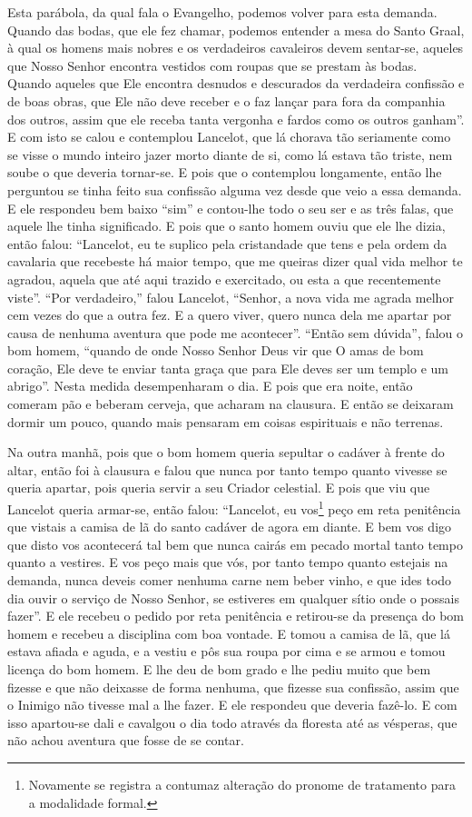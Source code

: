 Esta parábola, da qual fala o Evangelho, podemos volver para esta demanda.
Quando das bodas, que ele fez chamar, podemos entender a mesa do Santo Graal, à
qual os homens mais nobres e os verdadeiros cavaleiros devem sentar-se, aqueles
que Nosso Senhor encontra vestidos com roupas que se prestam às bodas. Quando
aqueles que Ele encontra desnudos e descurados da verdadeira confissão e de
boas obras, que Ele não deve receber e o faz lançar para fora da companhia dos
outros, assim que ele receba tanta vergonha e fardos como os outros ganham”.  E
com isto se calou e contemplou Lancelot, que lá chorava tão seriamente como se
visse o mundo inteiro jazer morto diante de si, como lá estava tão triste, nem
soube o que deveria tornar-se. E pois que o contemplou longamente, então lhe
perguntou se tinha feito sua confissão alguma vez desde que veio a essa
demanda. E ele respondeu bem baixo “sim” e contou-lhe todo o seu ser e as três
falas, que aquele lhe tinha significado. E pois que o santo homem ouviu que ele
lhe dizia, então falou: “Lancelot, eu te suplico pela cristandade que tens e
pela ordem da cavalaria que recebeste há maior tempo, que me queiras dizer qual
vida melhor te agradou, aquela que até aqui trazido e exercitado, ou esta a que
recentemente viste”. “Por verdadeiro,” falou Lancelot, “Senhor, a nova vida me
agrada melhor cem vezes do que a outra fez. E a quero viver, quero nunca dela
me apartar por causa de nenhuma aventura que pode me acontecer”. “Então sem
dúvida”, falou o bom homem, ``quando de onde Nosso Senhor Deus vir que O amas de
bom coração, Ele deve te enviar tanta graça  que para Ele deves ser um templo e
um abrigo”. Nesta medida desempenharam o dia. E pois que era
noite, então comeram pão e beberam cerveja, que acharam na clausura. E
então se deixaram dormir um pouco, quando mais pensaram em coisas espirituais e
não terrenas.

Na outra manhã, pois que o bom homem queria sepultar o cadáver à frente do
altar, então foi à clausura e falou que nunca por tanto tempo quanto vivesse se
queria apartar, pois queria servir a seu Criador celestial. E pois que viu que
Lancelot queria armar-se, então falou: “Lancelot, eu vos\footnote{ Novamente
se registra a contumaz alteração do pronome de tratamento para a modalidade
formal.} peço em reta penitência que vistais a camisa de lã do
santo cadáver de agora em diante. E bem vos digo que disto vos acontecerá tal
bem que nunca cairás em pecado mortal tanto tempo quanto a vestires. E vos peço
mais que vós, por tanto tempo quanto estejais na demanda, nunca deveis comer
nenhuma carne nem beber vinho, e que ides todo dia ouvir o serviço de Nosso
Senhor,  se estiveres em qualquer sítio onde o possais fazer”. E ele
recebeu o pedido por reta penitência e retirou-se da presença do bom homem e
recebeu a disciplina com boa vontade. E tomou a camisa de lã, que lá estava
afiada e aguda, e a vestiu e pôs sua roupa por cima e se armou e tomou licença
do bom homem. E lhe deu de bom grado e lhe pediu muito que bem fizesse e que
não deixasse de forma nenhuma, que fizesse sua confissão, assim que o Inimigo
não tivesse mal a lhe fazer. E ele respondeu que deveria fazê-lo. E com isso
apartou-se dali e cavalgou o dia todo através da floresta até as vésperas, que
não achou aventura que fosse de se contar. 

